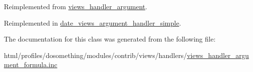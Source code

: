 Reimplemented from \hyperlink{classviews__handler__argument_a1dd6cc301b1c7c1c6829c59eb641a883}{views\_\-handler\_\-argument}.

Reimplemented in \hyperlink{classdate__views__argument__handler__simple_abfe22d750f3ce21303be3343499757c1}{date\_\-views\_\-argument\_\-handler\_\-simple}.

The documentation for this class was generated from the following file:\begin{DoxyCompactItemize}
\item 
html/profiles/dosomething/modules/contrib/views/handlers/\hyperlink{views__handler__argument__formula_8inc}{views\_\-handler\_\-argument\_\-formula.inc}\end{DoxyCompactItemize}
